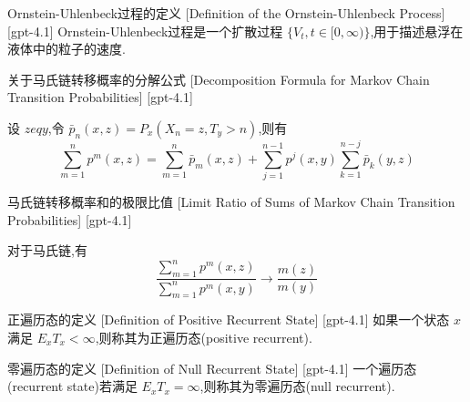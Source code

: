 \documentclass[UTF8]{ctexart}
\begin{document}
    
    
    \begin{dfn}
        {Ornstein-Uhlenbeck过程的定义}
        [Definition of the Ornstein-Uhlenbeck Process]
        [gpt-4.1]
        Ornstein-Uhlenbeck过程是一个扩散过程 $\{ V_{t}, t \in [0, \infty) \}$,用于描述悬浮在液体中的粒子的速度.
    \end{dfn}
    
    
    
    \begin{ppt}
        {关于马氏链转移概率的分解公式}
        [Decomposition Formula for Markov Chain Transition Probabilities]
        [gpt-4.1]
        
设 $z 
eq y$,令 $\bar{p}_{n}(x, z) = P_{x}(X_{n} = z, T_{y} > n)$,则有
\[
\sum_{m=1}^{n} p^{m}(x, z) = \sum_{m=1}^{n} \bar{p}_{m}(x, z) + \sum_{j=1}^{n-1} p^{j}(x, y) \sum_{k=1}^{n-j} \bar{p}_{k}(y, z)
\]

    \end{ppt}
    
    
    
    \begin{thm}
        {马氏链转移概率和的极限比值}
        [Limit Ratio of Sums of Markov Chain Transition Probabilities]
        [gpt-4.1]
        
对于马氏链,有
\[
\frac{\sum_{m=1}^{n} p^{m}(x, z)}{\sum_{m=1}^{n} p^{m}(x, y)} \to \frac{m(z)}{m(y)}
\]

    \end{thm}
    
    
    
    \begin{dfn}
        {正遍历态的定义}
        [Definition of Positive Recurrent State]
        [gpt-4.1]
        如果一个状态 $x$ 满足 $E_{x} T_{x} < \infty$,则称其为正遍历态(positive recurrent).
    \end{dfn}
    
    
    
    \begin{dfn}
        {零遍历态的定义}
        [Definition of Null Recurrent State]
        [gpt-4.1]
        一个遍历态(recurrent state)若满足 $E_{x} T_{x} = \infty$,则称其为零遍历态(null recurrent).
    \end{dfn}
    
\end{document}
